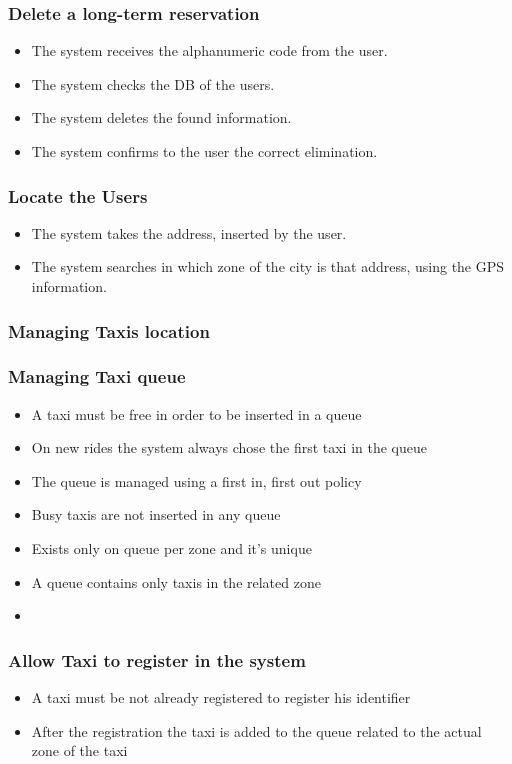 		\subsubsection{Delete a long-term reservation}
		\begin{itemize}
		\item The system receives the alphanumeric code from the user.
		\item The system checks the DB of the users.
		\item The system deletes the found information.
		\item The system confirms to the user the correct elimination.
		\end{itemize}
		\subsubsection{Locate the Users}
		\begin{itemize}
		\item The system takes the address, inserted by the user.
		\item The system searches in which zone of the city is that address, using the GPS information.
		\end{itemize}		
		\subsubsection{Managing Taxis location}
		\subsubsection{Managing Taxi queue}
		\begin{itemize}
			\item A taxi must be free in order to be inserted in a queue
			\item On new rides the system always chose the first taxi in the queue
			\item The queue is managed using a first in, first out policy
			\item Busy taxis are not inserted in any queue
			\item Exists only on queue per zone and it's unique
			\item A queue contains only taxis in the related zone
			\item 
		\end{itemize}
		\subsubsection{Allow Taxi to register in the system}
		\begin{itemize}
			\item A taxi must be not already registered to register his identifier
			\item After the registration the taxi is added to the queue related to the actual zone of the taxi
		\end{itemize}
